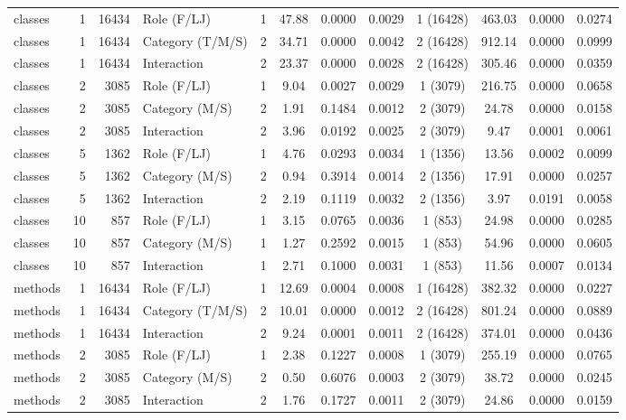 \begin{table}[H]
{\begin{tabular}{l r r l ccc r ccc r}
classes & 1 & 16434 & Role (F/LJ) & 1 & 47.88 & 0.0000 & 0.0029 & 1 (16428) & 463.03 & 0.0000 & 0.0274 \\ 
classes & 1 & 16434 & Category (T/M/S) & 2 & 34.71 & 0.0000 & 0.0042 & 2 (16428) & 912.14 & 0.0000 & 0.0999 \\ 
classes & 1 & 16434 & Interaction & 2 & 23.37 & 0.0000 & 0.0028 & 2 (16428) & 305.46 & 0.0000 & 0.0359 \\ 
classes & 2 & 3085 & Role (F/LJ) & 1 & 9.04 & 0.0027 & 0.0029 & 1 (3079) & 216.75 & 0.0000 & 0.0658 \\ 
classes & 2 & 3085 & Category (M/S) & 2 & 1.91 & 0.1484 & 0.0012 & 2 (3079) & 24.78 & 0.0000 & 0.0158 \\ 
classes & 2 & 3085 & Interaction & 2 & 3.96 & 0.0192 & 0.0025 & 2 (3079) & 9.47 & 0.0001 & 0.0061 \\ 
classes & 5 & 1362 & Role (F/LJ) & 1 & 4.76 & 0.0293 & 0.0034 & 1 (1356) & 13.56 & 0.0002 & 0.0099 \\ 
classes & 5 & 1362 & Category (M/S) & 2 & 0.94 & 0.3914 & 0.0014 & 2 (1356) & 17.91 & 0.0000 & 0.0257 \\ 
classes & 5 & 1362 & Interaction & 2 & 2.19 & 0.1119 & 0.0032 & 2 (1356) & 3.97 & 0.0191 & 0.0058 \\ 
classes & 10 & 857 & Role (F/LJ) & 1 & 3.15 & 0.0765 & 0.0036 & 1 (853) & 24.98 & 0.0000 & 0.0285 \\ 
classes & 10 & 857 & Category (M/S) & 1 & 1.27 & 0.2592 & 0.0015 & 1 (853) & 54.96 & 0.0000 & 0.0605 \\ 
classes & 10 & 857 & Interaction & 1 & 2.71 & 0.1000 & 0.0031 & 1 (853) & 11.56 & 0.0007 & 0.0134 \\ 
methods & 1 & 16434 & Role (F/LJ) & 1 & 12.69 & 0.0004 & 0.0008 & 1 (16428) & 382.32 & 0.0000 & 0.0227 \\ 
methods & 1 & 16434 & Category (T/M/S) & 2 & 10.01 & 0.0000 & 0.0012 & 2 (16428) & 801.24 & 0.0000 & 0.0889 \\ 
methods & 1 & 16434 & Interaction & 2 & 9.24 & 0.0001 & 0.0011 & 2 (16428) & 374.01 & 0.0000 & 0.0436 \\ 
methods & 2 & 3085 & Role (F/LJ) & 1 & 2.38 & 0.1227 & 0.0008 & 1 (3079) & 255.19 & 0.0000 & 0.0765 \\ 
methods & 2 & 3085 & Category (M/S) & 2 & 0.50 & 0.6076 & 0.0003 & 2 (3079) & 38.72 & 0.0000 & 0.0245 \\ 
methods & 2 & 3085 & Interaction & 2 & 1.76 & 0.1727 & 0.0011 & 2 (3079) & 24.86 & 0.0000 & 0.0159 \\ 

\end{tabular}}
\end{table}
